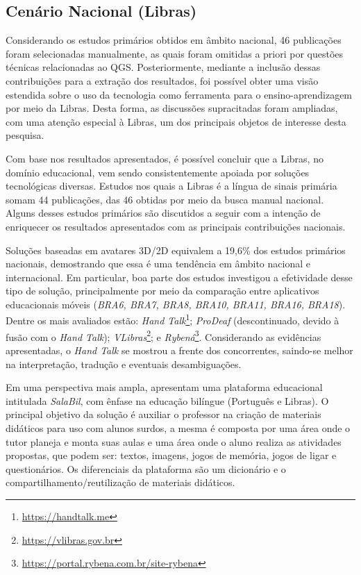 

\subsection{Cenário Nacional (Libras)}
\label{ms:cenario-nacional}

Considerando os estudos primários obtidos em âmbito nacional, 46 publicações foram selecionadas manualmente, as quais foram omitidas a priori por questões técnicas relacionadas ao QGS. Posteriormente, mediante a inclusão dessas contribuições para a extração dos resultados, foi possível obter uma visão estendida sobre o uso da tecnologia como ferramenta para o ensino-aprendizagem por meio da Libras. Desta forma, as discussões supracitadas foram ampliadas, com uma atenção especial à Libras, um dos principais objetos de interesse desta pesquisa.

Com base nos resultados apresentados, é possível concluir que a Libras, no domínio educacional, vem sendo consistentemente apoiada por soluções tecnológicas diversas. Estudos nos quais a Libras é a língua de sinais primária somam 44 publicações, das 46 obtidas por meio da busca manual nacional. Alguns desses estudos primários são discutidos a seguir com a intenção de enriquecer os resultados apresentados com as principais contribuições nacionais.

Soluções baseadas em avatares 3D/2D equivalem a 19,6\% dos estudos primários nacionais, demostrando que essa é uma tendência em âmbito nacional e internacional. Em particular, boa parte dos estudos investigou a efetividade desse tipo de solução, principalmente por meio da comparação entre aplicativos educacionais móveis (\textit{BRA6, BRA7, BRA8, BRA10, BRA11, BRA16, BRA18}). Dentre os mais avaliados estão: \textit{Hand Talk}\footnote{\url{https://handtalk.me}}; \textit{ProDeaf} (descontinuado, devido à fusão com o \textit{Hand Talk}); \textit{VLibras}\footnote{\url{https://vlibras.gov.br}}; e \textit{Rybená}\footnote{\url{https://portal.rybena.com.br/site-rybena}}. Considerando as evidências apresentadas, o \textit{Hand Talk} se mostrou a frente dos concorrentes, saindo-se melhor na interpretação, tradução e eventuais desambiguações.

Em uma perspectiva mais ampla,  apresentam uma plataforma educacional intitulada \textit{SalaBil}, com ênfase na educação bilíngue (Português e Libras). O principal objetivo da solução é auxiliar o professor na criação de materiais didáticos para uso com alunos surdos, a mesma é composta por uma área onde o tutor planeja e monta suas aulas e uma área onde o aluno realiza as atividades propostas, que podem ser: textos, imagens, jogos de memória, jogos de ligar e questionários. Os diferenciais da plataforma são um dicionário e o compartilhamento/reutilização de materiais didáticos.

